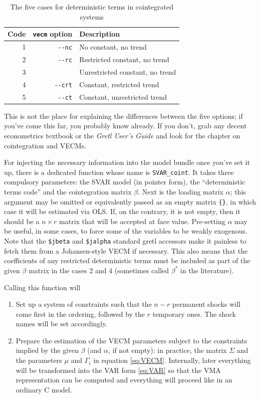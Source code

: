 \documentclass[a4paper,10pt]{article}
\newcommand{\cmd}[1]{\texttt{#1}}
\newcommand{\option}[1]{\texttt{-{}-#1}}
\newcounter{script}[section]
\begin{document}
\begin{table}[htbp]
  \centering
  \begin{tabular}{rrl}
    \hline
    Code & \cmd{vecm} option & Description\\
    \hline
    1 & \option{nc} & No constant, no trend \\
    2 & \option{rc} & Restricted constant, no trend \\
    3 &  & Unrestricted constant, no trend \\
    4 & \option{crt} & Constant, restricted trend \\
    5 & \option{ct} & Constant, unrestricted trend \\
    \hline
  \end{tabular}
  \caption{The five cases for deterministic terms in cointegrated systems}
  \label{tab:5cases}
\end{table}

This is not the place for explaining the differences between the five
options; if you've come this far, you probably know already. If you
don't, grab any decent econometrics textbook or the \emph{Gretl User's
  Guide} and look for the chapter on cointegration and VECMs.

For injecting the necessary information into the model bundle once
you've set it up, there is a dedicated function whose name is
\texttt{SVAR\_coint}. It takes three compulsory parameters: the SVAR
model (in pointer form), the ``deterministic terms code'' and the
cointegration matrix $\beta$. 
Next is the loading matrix $\alpha$; this argument may be omitted or 
equivalently passed as an empty matrix \texttt{\{\}}, in which case
it will be estimated via OLS. If, on the contrary, it is not empty,
then it should be a $n \times r$ matrix that will be accepted at face
value. Pre-setting $\alpha$ may be useful, in some cases, to force
some of the variables to be weakly exogenous. Note that the
\verb!$jbeta!  and \verb|$jalpha| standard gretl accessors make it
painless to fetch them from a Johansen-style VECM if necessary. 
This also means that the coefficients of any restricted deterministic 
terms must be included as part of the given $\beta$ matrix in the 
cases 2 and 4 (sometimes called $\beta^*$ in the literature).

Calling this function will
\begin{enumerate}
\item Set up a system of constraints such that the $n-r$ permanent
  shocks will come first in the ordering, followed by the $r$
  temporary ones. The shock names will be set accordingly.
\item Prepare the estimation of the VECM parameters subject to the constraints 
  implied by the given $\beta$ (and $\alpha$, if not empty): in practice, the
  matrix $\Sigma$ and the parameters $\mu$ and $\Gamma_i$ in equation
  \eqref{eq:VECM}. Internally, later everything will be transformed into 
  the VAR form \eqref{eq:VAR} so that the VMA representation can be computed 
  and everything will proceed like in an ordinary C model.
\end{enumerate}
\end{document}
